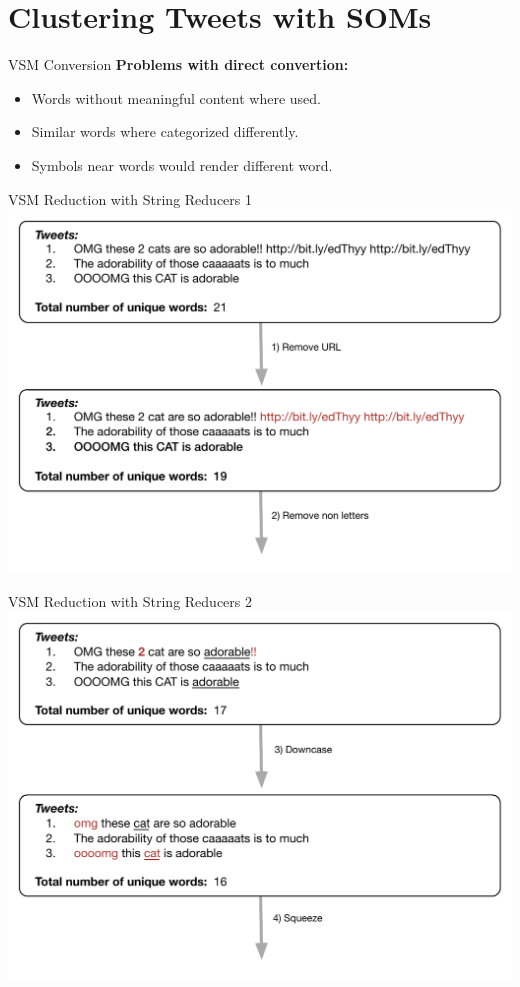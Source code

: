 \section{Clustering Tweets with SOMs}
\begin{frame}{VSM Conversion}
\textbf{Problems with direct convertion:}
\begin{itemize}
  \item Words without meaningful content where used.
  \item Similar words where categorized differently.
  \item Symbols near words would render different word.
\end{itemize}
\end{frame}

\begin{frame}{VSM Reduction with String Reducers 1}
  \includegraphics[width=1\textwidth]{images/string_reduction_1.pdf}
\end{frame}

\begin{frame}{VSM Reduction with String Reducers 2}
  \includegraphics[width=1\textwidth]{images/string_reduction_2.pdf}
\end{frame}

